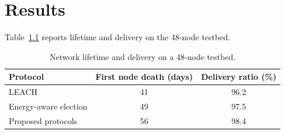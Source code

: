 \chapter{Results}
\label{ch:results}

Table~\ref{tab:lifetime} reports lifetime and delivery on the 48-node testbed.

\begin{table}[htbp]
  \centering
  \caption{Network lifetime and delivery on a 48-node testbed.}
  \label{tab:lifetime}
  \begin{tabular}{lcc}
    \toprule
    Protocol & First node death (days) & Delivery ratio (\%) \\
    \midrule
    LEACH                  & 41 & 96.2 \\
    Energy-aware election  & 49 & 97.5 \\
    Proposed protocols     & 56 & 98.4 \\
    \bottomrule
  \end{tabular}
\end{table}
